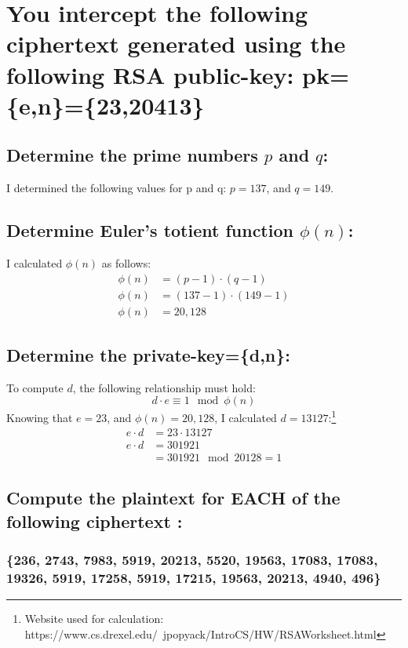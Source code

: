 \documentclass{article}
\begin{document}
\section*{You intercept the following ciphertext generated using the following RSA public-key: pk=\{e,n\}=\{23,20413\}}
\subsection*{Determine the prime numbers $p$ and $q$:}

I determined the following values for p and q:
$p = 137$, and $q = 149$.

\subsection*{Determine Euler's totient function $\phi(n)$:}
I calculated $\phi(n)$ as follows:
\begin{align*}
\phi(n) &= (p-1) \cdot (q-1) \\
\phi(n) &= (137 - 1) \cdot (149 - 1) \\
\phi(n) &= 20,128
\end{align*}

\subsection*{Determine the private-key=\{d,n\}:}
To compute $d$, the following relationship must hold:
\begin{equation}
d \cdot e \equiv 1 \mod{\phi(n)} 
\end{equation}
Knowing that $e=23$, and $\phi(n) = 20,128$, I calculated $d= 13127$:\footnote{Website used for calculation:  https://www.cs.drexel.edu/~jpopyack/IntroCS/HW/RSAWorksheet.html}
\begin{align*}
e \cdot d &= 23 \cdot 13127 \\
e \cdot d &= 301921 \\
			&= 301921 \mod{20128} = 1
\end{align*}


\subsection*{Compute the plaintext for EACH of the following ciphertext :}
\subsubsection*{\{236, 2743, 7983, 5919, 20213, 5520, 19563, 17083, 17083, 19326, 5919, 17258, 5919, 17215, 19563, 20213, 4940, 496\}}
\end{document}
